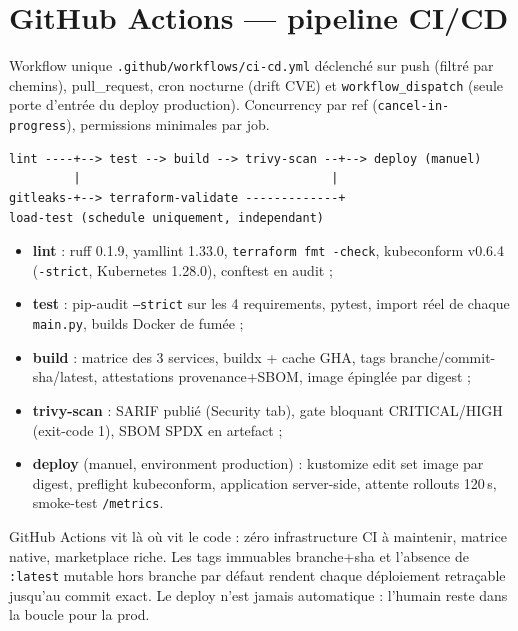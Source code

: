 \documentclass[12pt,a4paper,oneside]{report}
\begin{document}
\section{GitHub Actions --- pipeline CI/CD}

Workflow unique \texttt{.github/workflows/ci-cd.yml} d\'eclench\'e sur push (filtr\'e par chemins), pull\_request, cron nocturne (drift CVE) et \texttt{workflow\_dispatch} (seule porte d'entr\'ee du deploy production). Concurrency par ref (\texttt{cancel-in-progress}), permissions minimales par job.

\begin{lstlisting}[caption={Ordre et d\'ependances des jobs}]
lint ----+--> test --> build --> trivy-scan --+--> deploy (manuel)
         |                                   |
gitleaks-+--> terraform-validate -------------+
load-test (schedule uniquement, independant)
\end{lstlisting}

\begin{itemize}[itemsep=1pt]
  \item \textbf{lint} : ruff 0.1.9, yamllint 1.33.0, \texttt{terraform fmt -check}, kubeconform v0.6.4 (\texttt{-strict}, Kubernetes 1.28.0), conftest en audit ;
  \item \textbf{test} : pip-audit \texttt{--strict} sur les 4 requirements, pytest, import r\'eel de chaque \texttt{main.py}, builds Docker de fum\'ee ;
  \item \textbf{build} : matrice des 3 services, buildx + cache GHA, tags branche/commit-sha/latest, attestations provenance+SBOM, image \'epingl\'ee par digest ;
  \item \textbf{trivy-scan} : SARIF publi\'e (Security tab), gate bloquant CRITICAL/HIGH (exit-code 1), SBOM SPDX en artefact ;
  \item \textbf{deploy} (manuel, environment production) : kustomize edit set image par digest, preflight kubeconform, application server-side, attente rollouts 120\,s, smoke-test \texttt{/metrics}.
\end{itemize}

\begin{whybox}
GitHub Actions vit l\`a o\`u vit le code : zéro infrastructure CI \`a maintenir, matrice native, marketplace riche. Les tags immuables branche+sha et l'absence de \texttt{:latest} mutable hors branche par d\'efaut rendent chaque d\'eploiement retra\c{c}able jusqu'au commit exact. Le deploy n'est jamais automatique : l'humain reste dans la boucle pour la prod.
\end{whybox}
\end{document}
